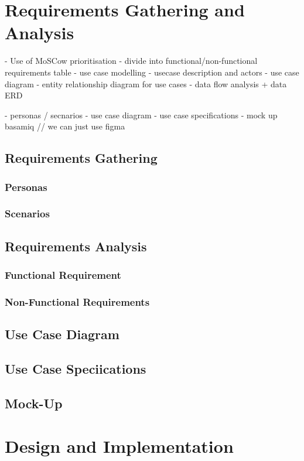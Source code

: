 \documentclass{report}
\begin{document}
\chapter{Requirements Gathering and Analysis}

- Use of MoSCow prioritisation 
- divide into functional/non-functional requirements table
- use case modelling  - usecase description and actors 
- use case diagram 
- entity relationship diagram for use cases
- data flow analysis + data ERD 

- personas / secnarios
- use case diagram 
- use case specifications 
- mock up  basamiq // we can just use figma 


\section{Requirements Gathering}
\subsection{Personas}
\subsection{Scenarios} 
\section{Requirements Analysis}
\subsection{Functional Requirement}
\subsection{Non-Functional Requirements}
\section{Use Case Diagram}
\section{Use Case Speciications} 
\section{Mock-Up}


\chapter{Design and Implementation}
\end{document}
